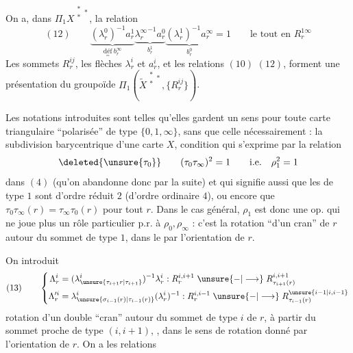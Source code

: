 On a, dans $\Pi_1 X^{\substack{*\\*}*}$, la relation
\[
(12)\qquad
\boxed{
\underbrace{(\lambda_r^0)^{-1}a_r^1}_{\underset{=}{\text{déf}}\ b_r^\infty}
\underbrace{{\lambda_r^\infty}^{-1}a_r^0}_{b_r^1}
\underbrace{(\lambda_r^1)^{-1}a_r^\infty}_{b_r^0}=1
}
\qquad\text{le tout en }R_r^{1\infty}
\]
Les sommets $R_r^{ij}$, les flèches $\lambda_r^i$ et $a_r^i$, et les relations $(10)$ $(12)$, forment une présentation du groupoïde $\Pi_1(\widetilde{X}^{\substack{*\\*}*},\{R_r^{ij}\})$.



Les notations introduites sont telles qu'elles gardent un sens pour toute carte triangulaire ``polarisée'' de type $\{0,1,\infty\}$, sans que celle  nécessairement : la subdivision barycentrique d'une carte $X$, condition qui s'exprime par la   relation
\[
\deleted{\unsure{\tau_0}}\qquad (\tau_0\tau_\infty)^2=1\qquad\text{i.e.}\quad\rho_1^2=1
\]
dans $(4)$ (qu'on abandonne donc par la suite) et qui signifie aussi que les   de type $1$ sont d'ordre réduit $2$ (d'ordre ordinaire $4$), ou encore que $\tau_0\tau_\infty(r)=\tau_\infty\tau_0(r)$ pour tout $r$. Dans le cas général, $\rho_1$ est donc une op. qui ne joue plus un rôle particulier p.r. à $\rho_0,\rho_\infty$ : c'est la rotation ``d'un cran'' de $r$ autour du sommet de type $1$, dans le   par l'orientation de $r$.

On introduit
\[
(13)\qquad\left\{
\begin{aligned}
\Lambda_r^i&=(\lambda_{\unsure{\tau_{i+1}r|\tau_{i+1}}}^i)^{-1}\lambda_r^i:R_r^{i,i+1}\mathrel{\unsure{-|\longrightarrow}} R_{\tau_{i+1}(r)}^{i,i+1}\\
\Lambda_r^{\prime i}&=\lambda_{\unsure{\sigma_{i-1}(r)|\tau_{i-1}(r)}}^i(\lambda_r^i)^{-1}:R_r^{i,i-1}\mathrel{\unsure{-|\longrightarrow}} R_{\tau_{i-1}(r)}^{\unsure{i-1|i,i-1}}
\end{aligned}\right.
\]
rotation d'un double ``cran'' autour du sommet de type $i$ de $r$, à partir du sommet proche de type $(i,i+1)$, , dans le sens de rotation donné par l'orientation de $r$.  On a les relations

